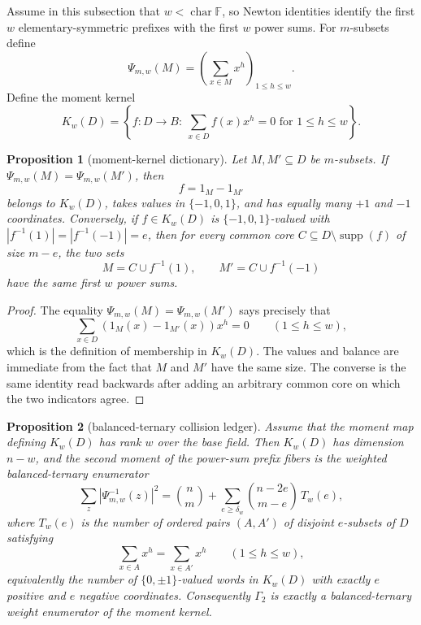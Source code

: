 \documentclass[11pt]{article}
\newtheorem{proposition}[proposition]{Proposition}
\theoremstyle{definition}
\theoremstyle{remark}
\newcommand{\F}{\mathbb{F}}
\newcommand{\B}{B}
\begin{document}
Assume in this subsection that \(w<\operatorname{char}\F\), so Newton identities identify the first \(w\) elementary-symmetric prefixes with the first \(w\) power sums.  For \(m\)-subsets define
\[
        \Psi_{m,w}(M)=\left(\sum_{x\in M}x^h\right)_{1\le h\le w}.
\]
Define the moment kernel
\[
        K_w(D)=\left\{f:D\to\B:\ \sum_{x\in D} f(x)x^h=0\text{ for }1\le h\le w\right\}.
\]

\begin{proposition}[moment-kernel dictionary]\label{prop:capfr1-moment-kernel}
Let \(M,M'\subseteq D\) be \(m\)-subsets.  If \(\Psi_{m,w}(M)=\Psi_{m,w}(M')\), then
\[
        f=1_M-1_{M'}
\]
belongs to \(K_w(D)\), takes values in \(\{-1,0,1\}\), and has equally many \(+1\) and \(-1\) coordinates.  Conversely, if \(f\in K_w(D)\) is \(\{-1,0,1\}\)-valued with \(|f^{-1}(1)|=|f^{-1}(-1)|=e\), then for every common core \(C\subseteq D\setminus\operatorname{supp}(f)\) of size \(m-e\), the two sets
\[
        M=C\cup f^{-1}(1),
        \qquad
        M'=C\cup f^{-1}(-1)
\]
have the same first \(w\) power sums.
\end{proposition}

\begin{proof}
The equality \(\Psi_{m,w}(M)=\Psi_{m,w}(M')\) says precisely that
\[
        \sum_{x\in D}(1_M(x)-1_{M'}(x))x^h=0
        \qquad(1\le h\le w),
\]
which is the definition of membership in \(K_w(D)\).  The values and balance are immediate from the fact that \(M\) and \(M'\) have the same size.  The converse is the same identity read backwards after adding an arbitrary common core on which the two indicators agree.

\end{proof}

\begin{proposition}[balanced-ternary collision ledger]\label{prop:capfr1-collision-ledger}
Assume that the moment map defining \(K_w(D)\) has rank \(w\) over the base field.  Then \(K_w(D)\) has dimension \(n-w\), and the second moment of the power-sum prefix fibers is the weighted balanced-ternary enumerator
\[
        \sum_z |\Psi_{m,w}^{-1}(z)|^2
        =
        \binom n m+
        \sum_{e\ge \delta_w}\binom{n-2e}{m-e}\,T_w(e),
\]
where \(T_w(e)\) is the number of ordered pairs \((A,A')\) of disjoint \(e\)-subsets of \(D\) satisfying
\[
        \sum_{x\in A}x^h=\sum_{x\in A'}x^h
        \qquad(1\le h\le w),
\]
equivalently the number of \(\{0,\pm1\}\)-valued words in \(K_w(D)\) with exactly \(e\) positive and \(e\) negative coordinates.  Consequently \(\Gamma_2\) is exactly a balanced-ternary weight enumerator of the moment kernel.
\end{proposition}
\end{document}
